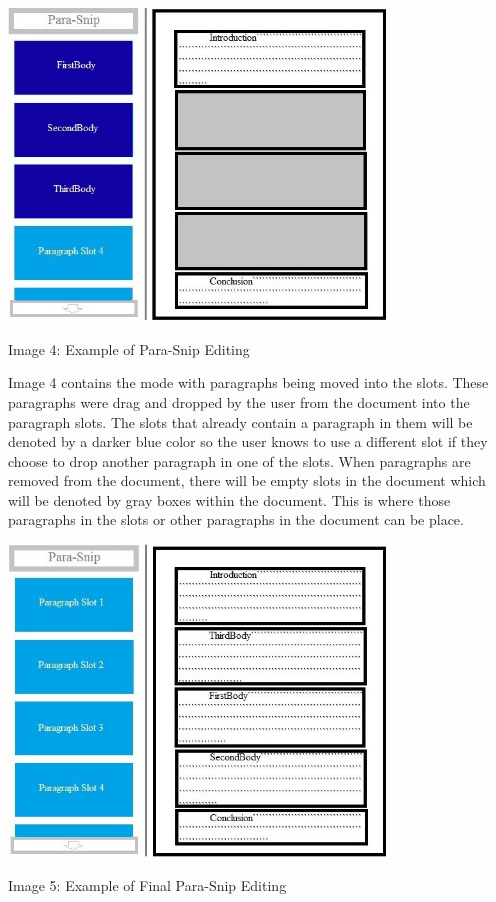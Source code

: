 \documentclass{article}
\begin{document}
{\begin{center}
\includegraphics[width=100mm]{Essay3.jpg}
\end{center}
\begin{center}
Image 4: Example of Para-Snip Editing
\end{center}
\medskip

	Image 4 contains the mode with paragraphs being moved into the slots. These paragraphs were drag and dropped by the user from the document into the paragraph slots. The slots that already contain a paragraph in them will be denoted by a darker blue color so the user knows to use a different slot if they choose to drop another paragraph in one of the slots. When paragraphs are removed from the document, there will be empty slots in the document which will be denoted by gray boxes within the document. This is where those paragraphs in the slots or other paragraphs in the document can be place. 

\begin{center}
\includegraphics[width=100mm]{Essay4.jpg}
\end{center}
\begin{center}
Image 5: Example of Final Para-Snip Editing
\end{center}
\medskip

}
\end{document}
